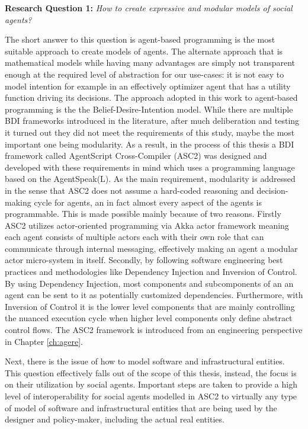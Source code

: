 \textbf{Research Question 1:} \textit{How to create expressive and modular models of social agents?}


The short answer to this question is agent-based programming is the most suitable approach to create models of agents. The alternate approach that is mathematical models while having many advantages are simply not transparent enough at the required level of abstraction for our use-cases: it is not easy to model intention for example in an effectively optimizer agent that has a utility function driving its decisions. The approach adopted in this work to agent-based programming is the the Belief-Desire-Intention model. While there are multiple BDI frameworks introduced in the literature, after much deliberation and testing it turned out they did not meet the requirements of this study, maybe the most important one being modularity. As a result, in the process of this thesis a BDI framework called AgentScript Cross-Compiler (ASC2) was designed and developed with these requirements in mind which uses a programming language based on the AgentSpeak(L). As the main requirement, modularity is addressed in the sense that ASC2 does not assume a hard-coded reasoning and decision-making cycle for agents, an in fact almost every aspect of the agents is programmable. This is made possible mainly because of two reasons. Firstly ASC2 utilizes actor-oriented programming via Akka actor framework meaning each agent consists of multiple actors each with their own role that can communicate through internal messaging, effectively making an agent a modular actor micro-system in itself. Secondly, by following software engineering best practices and methodologies like Dependency Injection and Inversion of Control. By using Dependency Injection, most components and subcomponents of an an agent can be sent to it as potentially customized dependencies. Furthermore, with Inversion of Control it is the lower level components that are mainly controlling the nuanced execution cycle when higher level components only define abstract control flows. The ASC2 framework is introduced from an engineering perspective in Chapter \ref{ch:agere}. 

Next, there is the issue of how to model software and infrastructural entities. This question effectively falls out of the scope of this thesis, instead, the focus is on their utilization by social agents. Important steps are taken to provide a high level of interoperability for social agents modelled in ASC2 to virtually any type of model of software and infrastructural entities that are being used by the designer and policy-maker, including the actual real entities.

